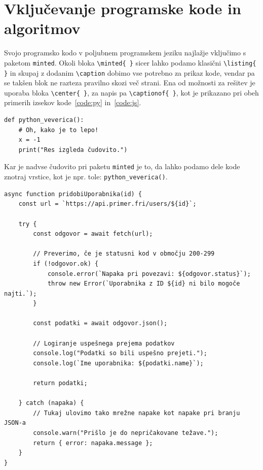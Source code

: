 \documentclass[a4paper,12pt,openright]{book}
\begin{document}
\chapter{Vključevanje programske kode in algoritmov}
\label{ch:koda}

Svojo programsko kodo v poljubnem programskem jeziku najlažje vključimo s paketom \texttt{minted}. Okoli bloka \texttt{\textbackslash minted\{ \}} sicer lahko podamo klasični \texttt{\textbackslash listing\{ \}} in skupaj z dodanim \texttt{\textbackslash caption} dobimo vse potrebno za prikaz kode, vendar pa se takšen blok ne razteza pravilno skozi več strani. Ena od možnosti za rešitev je uporaba bloka \texttt{\textbackslash center\{ \}}, za napis pa \texttt{\textbackslash captionof\{ \}}, kot je prikazano pri obeh primerih izsekov kode~\ref{code:py} in~\ref{code:js}.

\begin{center}
\label{code:py}
\begin{verbatim}
def python_veverica():
    # Oh, kako je to lepo!
    x = -1
    print("Res izgleda čudovito.")
\end{verbatim}


\end{center}

Kar je nadvse čudovito pri paketu \texttt{minted} je to, da lahko podamo dele kode znotraj vrstice, kot je npr. tole: \texttt{python_veverica()}.

\begin{center}
\label{code:js}
\begin{verbatim}
async function pridobiUporabnika(id) {
    const url = `https://api.primer.fri/users/${id}`;
    
    try {
        const odgovor = await fetch(url);
        
        // Preverimo, če je statusni kod v območju 200-299
        if (!odgovor.ok) {
            console.error(`Napaka pri povezavi: ${odgovor.status}`);
            throw new Error(`Uporabnika z ID ${id} ni bilo mogoče najti.`);
        }

        const podatki = await odgovor.json();
        
        // Logiranje uspešnega prejema podatkov
        console.log("Podatki so bili uspešno prejeti.");
        console.log(`Ime uporabnika: ${podatki.name}`);
        
        return podatki;
        
    } catch (napaka) {
        // Tukaj ulovimo tako mrežne napake kot napake pri branju JSON-a
        console.warn("Prišlo je do nepričakovane težave.");
        return { error: napaka.message };
    }
}
\end{verbatim}

\end{center}
\end{document}
